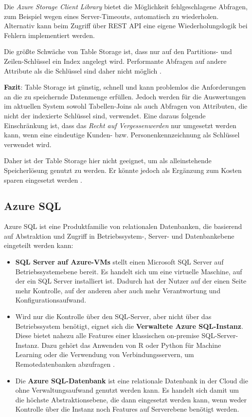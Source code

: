 Die \textit{Azure Storage Client Library} bietet die Möglichkeit fehlgeschlagene Abfragen, zum Beispiel wegen eines Server-Timeouts, automatisch zu wiederholen. Alternativ kann beim Zugriff über REST API eine eigene Wiederholungslogik bei Fehlern implementiert werden.

Die größte Schwäche von Table Storage ist, dass nur auf den Partitions- und Zeilen-Schlüssel ein Index angelegt wird. Performante Abfragen auf andere Attribute als die Schlüssel sind daher nicht möglich \cite{reagan_web_2018}.

\textbf{Fazit}: Table Storage ist günstig, schnell und kann problemlos die Anforderungen an die zu speichernde Datenmenge erfüllen. Jedoch werden für die Auswertungen im aktuellen System sowohl Tabellen-Joins als auch Abfragen von Attributen, die nicht der indexierte Schlüssel sind, verwendet. Eine daraus folgende Einschränkung ist, dass das \textit{Recht auf Vergessenwerden} nur umgesetzt werden kann, wenn eine eindeutige Kunden- bzw. Personenkennzeichnung als Schlüssel verwendet wird.

Daher ist der Table Storage hier nicht geeignet, um als alleinstehende Speicherlösung genutzt zu werden. Er könnte jedoch als Ergänzung zum Kosten sparen eingesetzt werden \cite[vgl.][]{reagan_web_2018}. 


\subsection{Azure SQL} \label{sec:grundlagen:azure_dienste:sql}
Azure SQL ist eine Produktfamilie von relationalen Datenbanken, die basierend auf Abstraktion und Zugriff in Betriebssystem-, Server- und Datenbankebene eingeteilt werden kann\cite{mauri_azure_2021}:

\begin{itemize}
\item \textbf{SQL Server auf Azure-VMs} stellt einen Microsoft SQL Server auf Betriebssystemebene bereit. Es handelt sich um eine virtuelle Maschine, auf der ein SQL Server installiert ist. Dadurch hat der Nutzer auf der einen Seite mehr Kontrolle, auf der anderen aber auch mehr Verantwortung und Konfigurationsaufwand. 
\item Wird nur die Kontrolle über den SQL-Server, aber nicht über das Betriebssystem benötigt, eignet sich die \textbf{Verwaltete Azure SQL-Instanz}. Diese bietet nahezu alle Features einer klassischen on-premise SQL-Server-Instanz. Dazu gehört das Anwenden von R oder Python für Machine Learning \cite{ericson_was_2021} oder die Verwendung von Verbindungsservern, um Remotedatenbanken abzufragen \cite{ljepava_t-sql_2021}.
\item Die \textbf{Azure SQL-Datenbank} ist eine relationale Datenbank in der Cloud die ohne Verwaltungsaufwand genutzt werden kann. Es handelt sich damit um die höchste Abstraktionsebene, die dann eingesetzt werden kann, wenn weder Kontrolle über die Instanz noch Features auf Serverebene benötigt werden.
\end{itemize}

